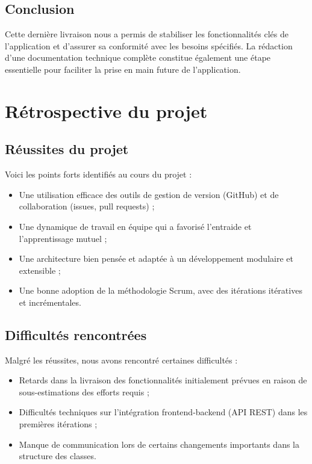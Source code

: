 \documentclass[a4paper]{article}
\begin{document}
\subsection{Conclusion}
Cette dernière livraison nous a permis de stabiliser les fonctionnalités clés de l'application et d'assurer sa conformité avec les besoins spécifiés. La rédaction d'une documentation technique complète constitue également une étape essentielle pour faciliter la prise en main future de l'application.


\section{Rétrospective du projet}

\subsection{Réussites du projet}
Voici les points forts identifiés au cours du projet :
\begin{itemize}
    \item Une utilisation efficace des outils de gestion de version (GitHub) et de collaboration (issues, pull requests) ;
    \item Une dynamique de travail en équipe qui a favorisé l'entraide et l'apprentissage mutuel ;
    \item Une architecture bien pensée et adaptée à un développement modulaire et extensible ;
    \item Une bonne adoption de la méthodologie Scrum, avec des itérations itératives et incrémentales.
\end{itemize}

\subsection{Difficultés rencontrées}
Malgré les réussites, nous avons rencontré certaines difficultés :
\begin{itemize}
    \item Retards dans la livraison des fonctionnalités initialement prévues en raison de sous-estimations des efforts requis ;
    \item Difficultés techniques sur l'intégration frontend-backend (API REST) dans les premières itérations ;
    \item Manque de communication lors de certains changements importants dans la structure des classes.
\end{itemize}
\end{document}
